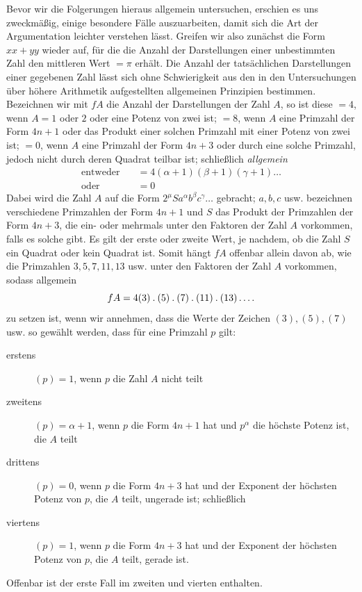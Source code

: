 \hypertarget{native-282-nexus6}{}\label{native-282-nexus6}
Bevor wir die Folgerungen hieraus allgemein untersuchen, erschien es uns zweckmäßig, einige besondere Fälle auszuarbeiten, damit sich die Art der Argumentation leichter verstehen lässt. Greifen wir also zunächst die Form $xx+yy$ wieder auf, für die die Anzahl der Darstellungen einer unbestimmten Zahl den mittleren Wert $=\pi$ erhält. Die Anzahl der tatsächlichen Darstellungen einer gegebenen Zahl lässt sich ohne Schwierigkeit aus den in den Untersuchungen über höhere Arithmetik aufgestellten allgemeinen Prinzipien bestimmen. Bezeichnen wir mit $fA$ die Anzahl der Darstellungen der Zahl $A$, so ist diese $=4$, wenn $A=1$ oder $2$ oder eine Potenz von zwei ist; $=8$, wenn $A$ eine Primzahl der Form $4n+1$ oder das Produkt
einer solchen Primzahl mit einer Potenz von zwei ist; $=0$, wenn $A$ eine Primzahl der Form $4n+3$ oder durch eine solche Primzahl, jedoch nicht durch deren Quadrat teilbar ist; schließlich \emph{allgemein}
\[
\begin{aligned}
\text{entweder}\quad&=4(\alpha+1)(\beta+1)(\gamma+1)\ldots\\
\text{oder}\quad&=0
\end{aligned}
\]
Dabei wird die Zahl $A$ auf die Form $2^\mu Sa^\alpha b^\beta c^\gamma\ldots$ gebracht; $a,b,c$ usw. bezeichnen verschiedene Primzahlen der Form $4n+1$ und $S$ das Produkt der Primzahlen der Form $4n+3$, die ein- oder mehrmals unter den Faktoren der Zahl $A$ vorkommen, falls es solche gibt. Es gilt der erste oder zweite Wert, je nachdem, ob die Zahl $S$ ein Quadrat oder kein Quadrat ist. Somit hängt $fA$ offenbar allein davon ab, wie die Primzahlen $3,5,7,11,13$ usw. unter den Faktoren der Zahl $A$ vorkommen, sodass allgemein
\[
fA=4(3)\mathbin{.}(5)\mathbin{.}(7)\mathbin{.}(11)\mathbin{.}(13)\mathinner{.\,.\,.\,.}
\]
zu setzen ist, wenn wir annehmen, dass die Werte der Zeichen $(3),(5),(7)$ usw. so gewählt werden, dass für eine Primzahl $p$ gilt:

\begin{description}
\item[erstens] $(p)=1$, wenn $p$ die Zahl $A$ nicht teilt
\item[zweitens] $(p)=\alpha+1$, wenn $p$ die Form $4n+1$ hat und $p^\alpha$ die höchste Potenz ist, die $A$ teilt
\item[drittens] $(p)=0$, wenn $p$ die Form $4n+3$ hat und der Exponent der höchsten Potenz von $p$, die $A$ teilt, ungerade ist; schließlich
\item[viertens] $(p)=1$, wenn $p$ die Form $4n+3$ hat und der Exponent der höchsten Potenz von $p$, die $A$ teilt, gerade ist.
\end{description}
Offenbar ist der erste Fall im zweiten und vierten enthalten.

